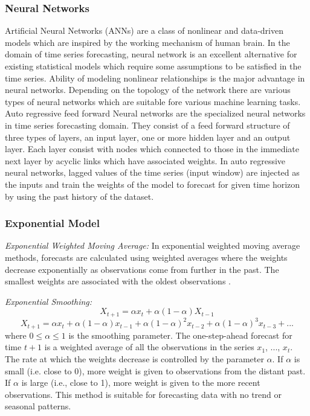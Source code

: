 \subsubsection{Neural Networks}
Artificial Neural Networks (ANNs) are a class of nonlinear and data-driven models which are inspired by the working mechanism of human brain. In the domain of time series forecasting, neural network is an excellent alternative for existing statistical models which require some assumptions to be satisfied in the time series. Ability of modeling nonlinear relationships is the major advantage in neural networks. Depending on the topology of the network there are various types of neural networks which are suitable fore various machine learning tasks.  Auto regressive feed forward Neural networks are the specialized neural networks in time series forecasting domain. They consist of a feed forward structure of three types of layers,  an input layer, one or more hidden layer and an output layer. Each layer consist with nodes which connected to those in the immediate next layer by acyclic links which have associated weights. In auto regressive neural networks, lagged values of the time series (input window) are injected as the inputs and train the weights of the model to forecast for given time horizon by using the past history of the dataset. 


\subsubsection{Exponential Model}
\noindent
\textit{Exponential Weighted Moving Average:}
In exponential weighted moving average methods, forecasts are calculated using weighted averages where the weights decrease exponentially as observations come from further in the past. The smallest weights are associated with the oldest observations \cite{Forecasting_OTexts} \cite{StatSoft} \cite{STAT510}.

\noindent
\textit{Exponential Smoothing:}
	$$X_{t+1}=\alpha x_t +\alpha(1-\alpha)X_{t-1}$$
	$$X_{t+1}=\alpha x_t +\alpha(1-\alpha)x_{t-1}+\alpha(1-\alpha)^2x_{t-2}+\alpha(1-\alpha)^3x_{t-3}+...$$
where $0\leq \alpha \leq 1$ is the smoothing parameter. The one-step-ahead forecast for time $t+1$ is a weighted average of all the observations in the series $x_1$, ..., $x_t$. The rate at which the weights decrease is controlled by the parameter $\alpha$. If $\alpha$ is small (i.e. close to 0), more weight is given to observations from the distant past. If $\alpha$ is large (i.e., close to 1), more weight is given to the more recent observations. This method is suitable for forecasting data with no trend or seasonal patterns.

